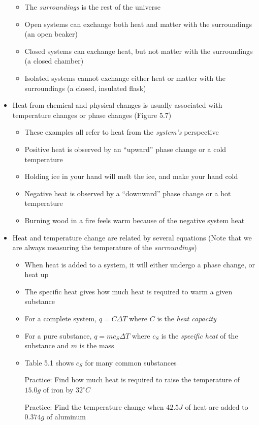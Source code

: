 \documentclass[12pt, openany, letterpaper]{memoir}
\begin{document}
\begin{itemize}
\begin{itemize}
      \item The \emph{surroundings} is the rest of the universe
      \item Open systems can exchange both heat and matter with the surroundings (an open beaker)
      \item Closed systems can exchange heat, but not matter with the surroundings (a closed chamber)
      \item Isolated systems cannot exchange either heat or matter with the surroundings (a closed, insulated flask)
    \end{itemize}
	\item Heat from chemical and physical changes is usually associated with temperature changes or phase changes (Figure 5.7)
    \begin{itemize}
      \item These examples all refer to heat from the \emph{system's} perspective
      \item Positive heat is observed by an “upward” phase change or a cold temperature
      \item Holding ice in your hand will melt the ice, and make your hand cold
      \item Negative heat is observed by a “downward” phase change or a hot temperature
      \item Burning wood in a fire feels warm because of the negative system heat
    \end{itemize}
  \item Heat and temperature change are related by several equations (Note that we are always measuring the temperature of the \emph{surroundings})
    \begin{itemize}
      \item When heat is added to a system, it will either undergo a phase change, or heat up
      \item The specific heat gives how much heat is required to warm a given substance
      \item For a complete system, $q=C\Delta T$ where $C$ is the \emph{heat capacity}
      \item For a pure substance, $q=mc_S\Delta T$ where $c_S$ is the \emph{specific heat} of the substance and $m$ is the mass
      \item Table 5.1 shows $c_S$ for many common substances

        Practice: Find how much heat is required to raise the temperature of $15.0g$ of iron by $32^\circ C$

        Practice: Find the temperature change when $42.5J$ of heat are added to $0.374g$ of aluminum
    \end{itemize}
\end{itemize}
\end{document}

